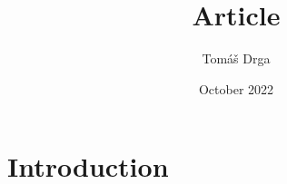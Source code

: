 \documentclass{article}
\title{Article}
\author{Tomáš Drga}
\date{October 2022}
\begin{document}
\maketitle

\section{Introduction}
\end{document}
